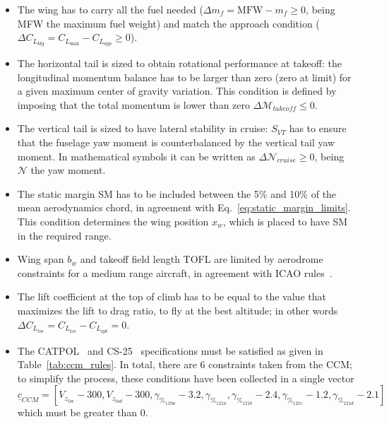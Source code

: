 \begin{itemize}
	\item The wing has to carry all the fuel needed ($\Delta m_f = \textrm{MFW}-m_f\geq0$, being MFW the maximum fuel weight) and match the approach condition ($\Delta C_{L_{ldg}}=C_{L_{\max}}-C_{L_{app}}\geq0$).
	
	\item The horizontal tail is sized to obtain rotational performance at takeoff: the longitudinal momentum balance has to be larger than zero (zero at limit) for a given maximum center of gravity variation. This condition is defined by imposing that the total momentum is lower than zero $\Delta\mathcal{M}_{takeoff}\leq0$.
	
	\item The vertical tail is sized to have lateral stability in cruise: $S_{VT}$ has to ensure that the fuselage yaw moment is counterbalanced by the vertical tail yaw moment. 
	In mathematical symbols it can be written as $\Delta\mathcal{N}_{cruise}\geq0$, being $\mathcal{N}$ the yaw moment.
	
	\item The static margin SM has to be included between the 5\% and 10\% of the mean aerodynamics chord, in agreement with Eq.~\eqref{eq:static_margin_limits}. This condition determines the wing position $x_w$, which is placed to have SM in the required range.
	
	\item Wing span $b_w$ and takeoff field length TOFL are limited by aerodrome constraints for a medium range aircraft, in agreement with ICAO rules~\cite{bib:debarros, bib:icao}.
	
	\item The lift coefficient at the top of climb has to be equal to the value that maximizes the lift to drag ratio, to fly at the best altitude; in other words $\Delta C_{L_{toc}}=C_{L_{toc}}-C_{L_{opt}}=0$.
	
	\item The CATPOL~\cite{bib:catpol} and CS-25~\cite{bib:cs25} specifications must be satisfied as given in Table~\ref{tab:ccm_rules}. 
	In total, there are 6 constraints taken from the CCM; to simplify the process, these conditions have been collected in a single vector $$\underline{c}_{CCM}=[V_{z_{toc}}-300, V_{z_{tod}}-300, \gamma_{\%_{119a}}-3.2, \gamma_{\%_{121a}}, \gamma_{\%_{121b}}-2.4, \gamma_{\%_{121c}}-1.2, \gamma_{\%_{121d}}-2.1]$$ which must be greater than 0. 
\end{itemize}

